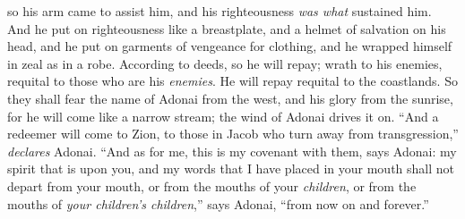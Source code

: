 \begin{biblechapter}
so his arm came to assist him, 
and his righteousness \textit{was what} sustained him.
\verse And he put on righteousness like a breastplate, 
and a helmet of salvation on his head, 
and he put on garments of vengeance for clothing, 
and he wrapped himself in zeal as in a robe.
\verse According to deeds, so he will repay; 
wrath to his enemies, requital to those who are his \textit{enemies}. 
He will repay requital to the coastlands.
\verse So they shall fear the name of Adonai from the west, 
and his glory from the sunrise, 
for he will come like a narrow stream; 
the wind of Adonai drives it on.
\verse “And a redeemer will come to Zion, 
to those in Jacob who turn away from transgression,” \textit{declares} Adonai.
\verse “And as for me, this is my covenant with them, says Adonai: my spirit that is upon you, 
and my words that I have placed in your mouth 
shall not depart from your mouth, 
or from the mouths of your \textit{children}, 
or from the mouths of \textit{your children’s children},” 
says Adonai, “from now on and forever.”
\end{biblechapter}

